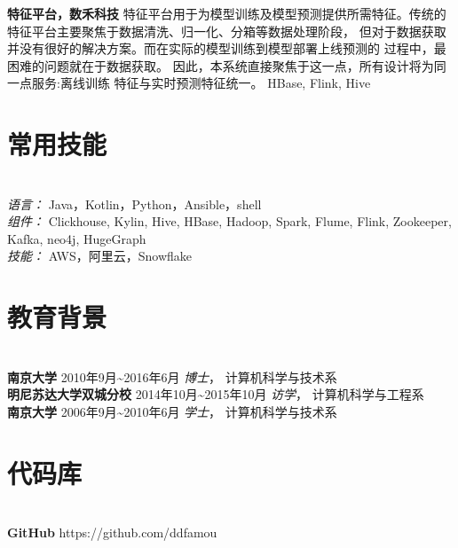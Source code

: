 \documentclass{res}[8.5pt]
\begin{document}
\begin{resume}
                \vspace{-10pt}
                {\bf 特征平台，数禾科技}
                特征平台用于为模型训练及模型预测提供所需特征。传统的特征平台主要聚焦于数据清洗、归一化、分箱等数据处理阶段，
                但对于数据获取并没有很好的解决方案。而在实际的模型训练到模型部署上线预测的 过程中，最困难的问题就在于数据获取。
                因此，本系统直接聚焦于这一点，所有设计将为同一点服务:离线训练 特征与实时预测特征统一。
                HBase, Flink, Hive


                \vspace{-10pt}
                \section{常用技能}
                \vspace{-12pt}
                \hrulefill\\
                {\sl 语言：}  Java，Kotlin，Python，Ansible，shell\\
                {\sl 组件：} Clickhouse, Kylin, Hive, HBase, Hadoop, Spark, Flume, Flink, Zookeeper, Kafka, neo4j, HugeGraph\\
                {\sl 技能：} AWS，阿里云，Snowflake

                \vspace{-12pt}
                \section{{教育背景}}
                \vspace{-12pt}
                \hrulefill\\
                {\bf 南京大学} \hfill  2010年9月\textasciitilde 2016年6月 \hspace{0.25in}
                {\sl 博士}， 计算机科学与技术系\\
                {\bf 明尼苏达大学双城分校} \hfill 2014年10月\textasciitilde 2015年10月 \hspace{0.25in}
                {\sl 访学}， 计算机科学与工程系  \\
                {\bf 南京大学}  \hfill 2006年9月\textasciitilde 2010年6月  \hspace{0.25in}
                {\sl 学士}， 计算机科学与技术系

                \vspace{-12pt}
                \section{{代码库}}
                \vspace{-12pt}
                \hrulefill\\
                {\bf GitHub} \hfill https://github.com/ddfamou

        \end{resume}
\end{document}
